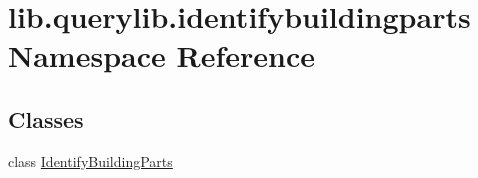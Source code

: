 \hypertarget{namespacelib_1_1querylib_1_1identifybuildingparts}{\section{lib.\-querylib.\-identifybuildingparts Namespace Reference}
\label{namespacelib_1_1querylib_1_1identifybuildingparts}
}
\subsection*{Classes}
\begin{DoxyCompactItemize}
\item 
class \hyperlink{classlib_1_1querylib_1_1identifybuildingparts_1_1_identify_building_parts}{Identify\-Building\-Parts}
\end{DoxyCompactItemize}
